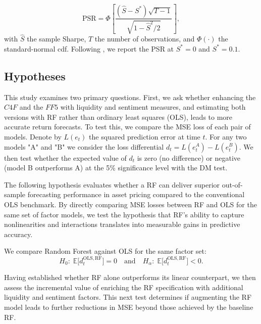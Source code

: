 \begin{equation}
\mathrm{PSR}= \Phi\left[\frac{\left(\hat{S}-S^{*}\right)\sqrt{T-1}}{\sqrt{1-\hat{S}^{2}/2}}\right],
\end{equation}
with $\hat{S}$ the sample Sharpe, $T$ the number of observations, and $\Phi(\cdot)$ the standard-normal cdf. Following , we report the PSR at $S^{*}=0$ and $S^{*}=0.1$.


\subsection{Hypotheses}
\label{subsec:hypotheses}

This study examines two primary questions.  First, we ask whether enhancing the $C4F$ and the $FF5$ with liquidity and sentiment measures, and estimating both versions with RF rather than ordinary least squares (OLS), leads to more accurate return forecasts.  To test this, we compare the MSE loss of each pair of models.  Denote by \(L(e_t)\) the squared prediction error at time \(t\). For any two models "A" and "B" we consider the loss differential \(d_t = L(e^{A}_t) - L(e^{B}_t)\).  We then test whether the expected value of \(d_t\) is zero (no difference) or negative (model B outperforms A) at the 5\% significance level with the DM test.

The following hypothesis evaluates whether a RF can deliver superior out-of-sample forecasting performance in asset pricing compared to the conventional OLS benchmark.  By directly comparing MSE losses between RF and OLS for the same set of factor models, we test the hypothesis that RF's ability to capture nonlinearities and interactions translates into measurable gains in predictive accuracy.
\setcounter{hyp}{0}

\begin{hyp} \label{hyp:dm2}
We compare Random Forest against OLS for the same factor set:
\[
H_{0}:\;\mathbb{E}\bigl[d^{\mathrm{OLS,RF}}_{t}\bigr]=0
\quad\text{and}\quad
H_{\alpha}:\;\mathbb{E}\bigl[d^{\mathrm{OLS,RF}}_{t}\bigr]<0.
\]
\end{hyp}

Having established whether RF alone outperforms its linear counterpart, we then assess the incremental value of enriching the RF specification with additional liquidity and sentiment factors.  This next test determines if augmenting the RF model leads to further reductions in MSE beyond those achieved by the baseline RF.

